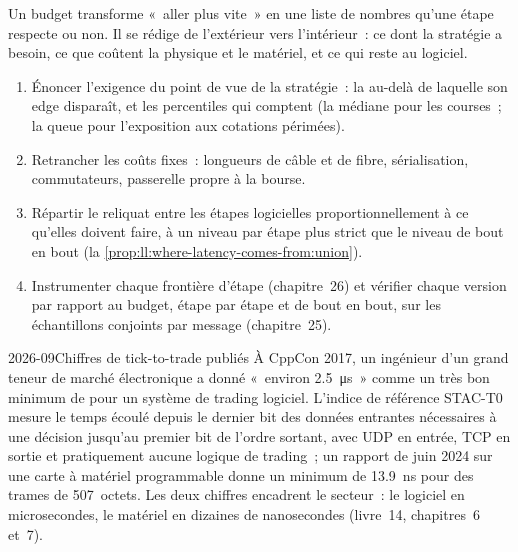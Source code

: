 Un budget transforme «~aller plus vite~» en une liste de nombres qu'une étape respecte ou non. Il se rédige
de l'extérieur vers l'intérieur~: ce dont la stratégie a besoin, ce que coûtent la physique et le matériel, et ce qui reste au logiciel.

\begin{method}\label{met:ll:where-latency-comes-from:budget}
\begin{enumerate}
\item Énoncer l'exigence du point de vue de la stratégie~: la  au-delà de laquelle son edge disparaît, et les
percentiles qui comptent (la médiane pour les courses~; la queue pour l'exposition aux cotations périmées).
\item Retrancher les coûts fixes~: longueurs de câble et de fibre, sérialisation, commutateurs, passerelle propre à la bourse.
\item Répartir le reliquat entre les étapes logicielles proportionnellement à ce qu'elles doivent faire, à un niveau par étape plus strict
que le niveau de bout en bout (la \cref{prop:ll:where-latency-comes-from:union}).
\item Instrumenter chaque frontière d'étape (chapitre~26) et vérifier chaque version par rapport au budget, étape par étape et de bout
en bout, sur les échantillons conjoints par message (chapitre~25).
\end{enumerate}
\end{method}

\begin{dated}{2026-09}{Chiffres de tick-to-trade publiés}\label{dat:ll:where-latency-comes-from:published}
À CppCon 2017, un ingénieur d'un grand teneur de marché électronique a donné «~environ \qty{2.5}{\micro\second}~» comme un très
bon minimum de  pour un système de trading logiciel. L'indice de référence STAC-T0 mesure le temps écoulé depuis le
dernier bit des données entrantes nécessaires à une décision jusqu'au premier bit de l'ordre sortant, avec UDP en entrée, TCP en sortie et
pratiquement aucune logique de trading~; un rapport de juin 2024 sur une carte à matériel programmable donne un minimum de
\qty{13.9}{\nano\second} pour des trames de 507~octets. Les deux chiffres encadrent le secteur~: le logiciel en microsecondes,
le matériel en dizaines de nanosecondes (livre~14, chapitres~6 et~7).
\end{dated}

